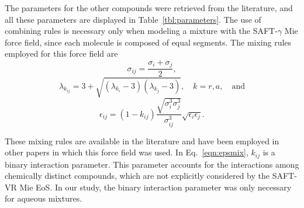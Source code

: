 \documentclass[preprint]{elsarticle}
\begin{document}
	The parameters for the other compounds were retrieved from the literature, and all these parameters are displayed in Table~\ref{tbl:parameters}. The use of combining rules is necessary only when modeling a mixture with the SAFT-$\gamma$ Mie force field, since each molecule is composed of equal segments. The mixing rules employed for this force field are \cite{lafitte2013}
	\begin{equation}
	\sigma_{ij} =\frac{\sigma_i+\sigma_j}{2},
	\label{eqn:sigmamix}
	\end{equation}
	\begin{equation}
	\lambda_{k_{ij}} = 3 + \sqrt{(\lambda_{k_i}-3)(\lambda_{k_j}-3)}, \quad k=r,a, \quad \text{and}
	\label{eqn:lambdamix}
	\end{equation}
	\begin{equation}
	\label{eqn:epsmix}
	\epsilon_{ij} =(1-k_{ij})\frac{\sqrt{\sigma_i^3\sigma_j^3}}{\sigma_{ij}^3}\sqrt{\epsilon_i\epsilon_j}.
	\end{equation}
	
	These mixing rules are available in the literature and have been employed in other papers in which this force field was used. In Eq.~\eqref{eqn:epsmix}, $k_{ij}$ is a binary interaction parameter. This parameter accounts for the interactions among chemically distinct compounds, which are not explicitly considered by the SAFT-VR Mie EoS. In our study, the binary interaction parameter was only necessary for aqueous mixtures.
	
\end{document}
